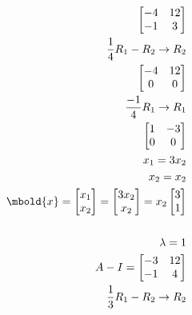 \documentclass[12pt letter]{report}
\begin{document}
{\begin{align*}
\begin{bmatrix}
                 -4 & 12 \\
                 -1 & 3
               \end{bmatrix}                                                                      \\
    \frac{1}{4}R_1 - R_2  \rightarrow R_2                                                          \\
    \begin{bmatrix}
      -4 & 12 \\
      0  & 0  \\
    \end{bmatrix}
    \\
    \frac{-1}{4}R_1 \to R_1                                                                        \\
    \begin{bmatrix}
      1 & -3 \\
      0 & 0  \\
    \end{bmatrix}
    \\
    x_1 = 3x_2                                                                                     \\
    x_2 = x_2
    \\
    \mbold{x} = \begin{bmatrix} x_1 \\ x_2 \end{bmatrix} = \begin{bmatrix} 3x_2 \\ x_2 \end{bmatrix} = x_2\begin{bmatrix} 3
                                                                                                            \\ 1\end{bmatrix}
    \\
    \\
    \lambda = 1                                                                                    \\
    A - I  = \begin{bmatrix}
               -3 & 12 \\
               -1 & 4
             \end{bmatrix}                                                                        \\
    \frac{1}{3}R_1 - R_2  \rightarrow R_2                                                          \\

\end{align*}}
\end{document}
